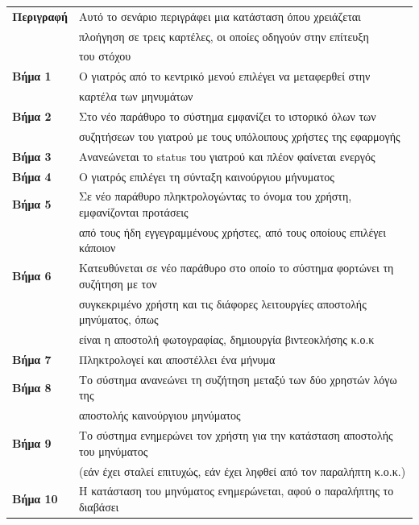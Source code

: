 \documentclass{article}
\newcommand\T{\rule{0pt}{2.6ex}}       %
\newcommand\B{\rule[-1.2ex]{0pt}{0pt}}
\begin{document}
 \begin{center}
     \begin{tabular}{|l|l|}
     \hline
      \textbf{Περιγραφή} & Αυτό το σενάριο περιγράφει μια κατάσταση όπου χρειάζεται \T \\& πλοήγηση σε τρεις καρτέλες, οι οποίες οδηγούν στην επίτευξη \\& του στόχου \B \\ 
      \hline
      \textbf{Βήμα 1} & Ο γιατρός από το κεντρικό μενού επιλέγει να μεταφερθεί στην \T \\& καρτέλα των μηνυμάτων \B \\
      \hline
      \textbf{Βήμα 2} & Στο νέο παράθυρο το σύστημα εμφανίζει το ιστορικό όλων των \T \\& συζητήσεων του γιατρού με τους υπόλοιπους χρήστες της εφαρμογής \B \\
      \hline
      \textbf{Βήμα 3} & Ανανεώνεται το status του γιατρού και πλέον φαίνεται ενεργός \T\B \\
      \hline
      \textbf{Βήμα 4} & Ο γιατρός επιλέγει τη σύνταξη καινούργιου μήνυματος \T\B \\
      \hline
      \textbf{Βήμα 5} & Σε νέο παράθυρο πληκτρολογώντας το όνομα του χρήστη, εμφανίζονται προτάσεις \T \\& από τους ήδη εγγεγραμμένους χρήστες, από τους οποίους επιλέγει κάποιον  \B \\
      \hline
      \textbf{Βήμα 6} & Κατευθύνεται σε νέο παράθυρο στο οποίο το σύστημα φορτώνει τη συζήτηση με τον \T \\& συγκεκριμένο χρήστη και τις διάφορες λειτουργίες αποστολής μηνύματος, όπως \\& είναι η αποστολή φωτογραφίας, δημιουργία βιντεοκλήσης κ.ο.κ  \B \\
      \hline
      \textbf{Βήμα 7} & Πληκτρολογεί και αποστέλλει ένα μήνυμα \T\B \\
      \hline
      \textbf{Βήμα 8} & Το σύστημα ανανεώνει τη συζήτηση μεταξύ των δύο χρηστών λόγω της \T \\& αποστολής καινούργιου μηνύματος \B \\
      \hline
      \textbf{Βήμα 9} & Το σύστημα ενημερώνει τον χρήστη για την κατάσταση αποστολής του μηνύματος \T \\& (εάν έχει σταλεί επιτυχώς, εάν έχει ληφθεί από τον παραλήπτη κ.ο.κ.) \B \\
      \hline
      \textbf{Βήμα 10} & Η κατάσταση του μηνύματος ενημερώνεται, αφού ο παραλήπτης το διαβάσει \T\B \\
      \hline
     \end{tabular}
 \end{center}
 
\end{document}
